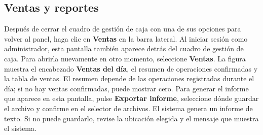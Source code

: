 \documentclass[12pt,a4paper]{article}
\begin{document}
\subsection{Ventas y reportes}
Después de cerrar el cuadro de gestión de caja con una de sus opciones para volver al panel, haga clic en \textbf{Ventas} en la barra lateral. Al iniciar sesión como administrador, esta pantalla también aparece detrás del cuadro de gestión de caja. Para abrirla nuevamente en otro momento, seleccione \textbf{Ventas}.
La figura muestra el encabezado \textbf{Ventas del día}, el resumen de operaciones confirmadas y la tabla de ventas. El resumen depende de las operaciones registradas durante el día; si no hay ventas confirmadas, puede mostrar cero. Para generar el informe que aparece en esta pantalla, pulse \textbf{Exportar informe}, seleccione dónde guardar el archivo y confirme en el selector de archivos. El sistema genera un informe de texto. Si no puede guardarlo, revise la ubicación elegida y el mensaje que muestra el sistema.
\end{document}

